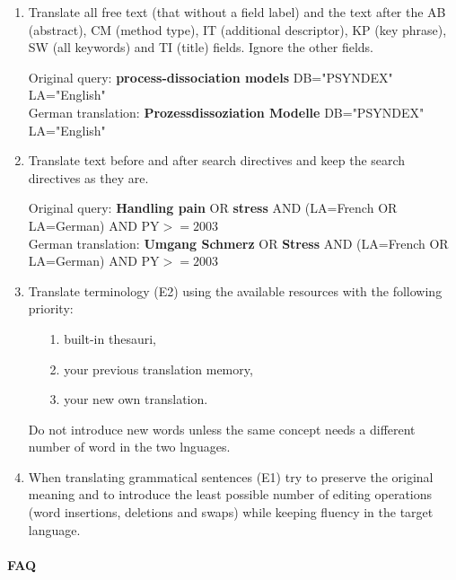\documentclass[a4paper,10pt]{article}
\newcommand{\ex}[1]{\begin{tcolorbox}[]{#1}\end{tcolorbox}}
\begin{document}
\begin{enumerate}

 \item Translate all free text (that without a field label) and the text after the AB (abstract), CM (method type), IT (additional descriptor), KP (key phrase), SW (all keywords) and TI (title) fields. Ignore the other fields.
 \ex{Original query: {\bf process-dissociation models} DB="PSYNDEX" LA="English" \\
     German translation: {\bf Prozessdissoziation Modelle} DB="PSYNDEX" LA="English"}

 \item Translate text before and after search directives and keep the search directives as they are.
 \ex{ Original query: {\bf Handling pain} OR {\bf stress} AND (LA=French OR LA=German) AND PY$>=2003$ \\
  German translation: {\bf Umgang Schmerz} OR  {\bf Stress} AND  (LA=French OR LA=German) AND PY$>=2003$}
  
 \item Translate terminology (E2) using the available resources with the following priority: 
 \begin{enumerate}
 \item[1.]  built-in thesauri, 
 \item[2.]  your previous translation memory,
 \item[3.]  your new own translation. 
 \end{enumerate}
 Do not introduce new words unless the same concept needs a different number of word in the two lnguages.

 \item When translating grammatical sentences (E1) try to preserve the original meaning and to introduce the least possible number of editing operations (word insertions, deletions and swaps) while keeping fluency in the target language. 

\end{enumerate}



\paragraph{FAQ}
\end{document}
